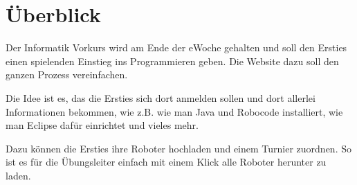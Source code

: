 \documentclass[info_VK_Website_Dokumentation.tex]{subfile}
\begin{document}
 	
\chapter{Überblick} 

Der Informatik Vorkurs wird am Ende der eWoche gehalten und soll den Ersties einen spielenden Einstieg ins Programmieren geben. Die Website dazu soll den ganzen Prozess vereinfachen.

Die Idee ist es, das die Ersties sich dort anmelden sollen und dort allerlei Informationen bekommen, wie z.B. wie man Java und Robocode installiert, wie man Eclipse dafür einrichtet und vieles mehr.

Dazu können die Ersties ihre Roboter hochladen und einem Turnier zuordnen. So ist es für die Übungsleiter einfach mit einem Klick alle Roboter herunter zu laden.

 
\end{document}
